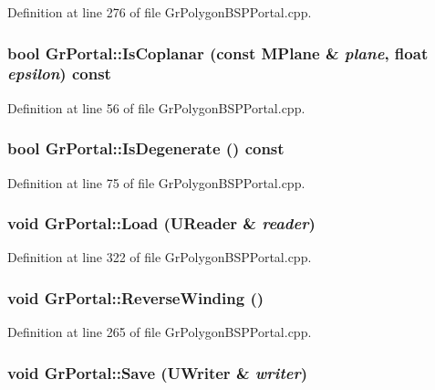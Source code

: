 Definition at line 276 of file GrPolygonBSPPortal.cpp.\hypertarget{class_gr_portal_7b60340fcd9dd5d2f211fe3ef8da73aa}{
\subsubsection[{IsCoplanar}]{\setlength{\rightskip}{0pt plus 5cm}bool GrPortal::IsCoplanar (const {\bf MPlane} \& {\em plane}, \/  float {\em epsilon}) const}}
\label{class_gr_portal_7b60340fcd9dd5d2f211fe3ef8da73aa}




Definition at line 56 of file GrPolygonBSPPortal.cpp.\hypertarget{class_gr_portal_f315cb8bc85fbbaf5f6f6c8091e025a5}{
\subsubsection[{IsDegenerate}]{\setlength{\rightskip}{0pt plus 5cm}bool GrPortal::IsDegenerate () const}}
\label{class_gr_portal_f315cb8bc85fbbaf5f6f6c8091e025a5}




Definition at line 75 of file GrPolygonBSPPortal.cpp.\hypertarget{class_gr_portal_774771467d6a976f294acb74f82339cc}{
\subsubsection[{Load}]{\setlength{\rightskip}{0pt plus 5cm}void GrPortal::Load ({\bf UReader} \& {\em reader})}}
\label{class_gr_portal_774771467d6a976f294acb74f82339cc}




Definition at line 322 of file GrPolygonBSPPortal.cpp.\hypertarget{class_gr_portal_ac50ae0eb9b06456b746a5f9350eedb7}{
\subsubsection[{ReverseWinding}]{\setlength{\rightskip}{0pt plus 5cm}void GrPortal::ReverseWinding ()}}
\label{class_gr_portal_ac50ae0eb9b06456b746a5f9350eedb7}




Definition at line 265 of file GrPolygonBSPPortal.cpp.\hypertarget{class_gr_portal_6eab7a51a1a62da988b307da7a65cad8}{
\subsubsection[{Save}]{\setlength{\rightskip}{0pt plus 5cm}void GrPortal::Save ({\bf UWriter} \& {\em writer})}}
\label{class_gr_portal_6eab7a51a1a62da988b307da7a65cad8}




